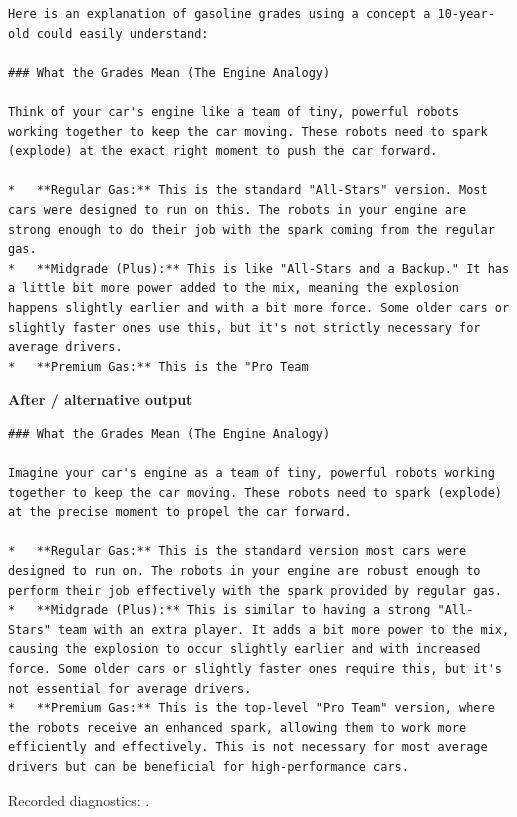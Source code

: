 \begin{Verbatim}
Here is an explanation of gasoline grades using a concept a 10-year-old could easily understand:

### What the Grades Mean (The Engine Analogy)

Think of your car's engine like a team of tiny, powerful robots working together to keep the car moving. These robots need to spark (explode) at the exact right moment to push the car forward.

*   **Regular Gas:** This is the standard "All-Stars" version. Most cars were designed to run on this. The robots in your engine are strong enough to do their job with the spark coming from the regular gas.
*   **Midgrade (Plus):** This is like "All-Stars and a Backup." It has a little bit more power added to the mix, meaning the explosion happens slightly earlier and with a bit more force. Some older cars or slightly faster ones use this, but it's not strictly necessary for average drivers.
*   **Premium Gas:** This is the "Pro Team
\end{Verbatim}

\textbf{After / alternative output}

\begin{Verbatim}
### What the Grades Mean (The Engine Analogy)

Imagine your car's engine as a team of tiny, powerful robots working together to keep the car moving. These robots need to spark (explode) at the precise moment to propel the car forward.

*   **Regular Gas:** This is the standard version most cars were designed to run on. The robots in your engine are robust enough to perform their job effectively with the spark provided by regular gas.
*   **Midgrade (Plus):** This is similar to having a strong "All-Stars" team with an extra player. It adds a bit more power to the mix, causing the explosion to occur slightly earlier and with increased force. Some older cars or slightly faster ones require this, but it's not essential for average drivers.
*   **Premium Gas:** This is the top-level "Pro Team" version, where the robots receive an enhanced spark, allowing them to work more efficiently and effectively. This is not necessary for most average drivers but can be beneficial for high-performance cars.
\end{Verbatim}

Recorded diagnostics:
\texttt{}.

